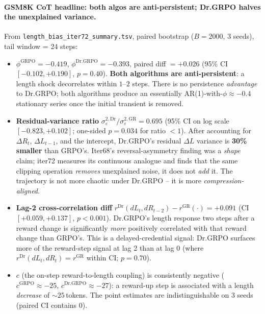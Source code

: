 \paragraph{GSM8K CoT headline: both algos are anti-persistent; Dr.GRPO halves the unexplained variance.}
From \texttt{length\_bias\_iter72\_summary.tsv}, paired bootstrap
($B = 2000$, 3 seeds), tail window = 24 steps:
\begin{itemize}
\item $\phi^{\mathrm{GRPO}} = -0.419$, $\phi^{\mathrm{Dr.GRPO}} = -0.393$,
      paired diff $= +0.026$ (95\% CI $[-0.102, +0.190]$, $p = 0.40$).
      \textbf{Both algorithms are anti-persistent}: a length shock
      decorrelates within $1$--$2$ steps. There is no persistence
      \emph{advantage} to Dr.GRPO; both algorithms produce an
      essentially AR(1)-with-$\phi \approx -0.4$ stationary series once
      the initial transient is removed.
\item \textbf{Residual-variance ratio} $\sigma^{2,\mathrm{Dr}}_\varepsilon /
      \sigma^{2,\mathrm{GR}}_\varepsilon = 0.695$ (95\% CI on log scale
      $[-0.823, +0.102]$; one-sided $p = 0.034$ for ratio $< 1$).
      After accounting for $\Delta R_t$, $\Delta L_{t-1}$, and the
      intercept, Dr.GRPO's residual $\Delta L$ variance is
      \textbf{30\% smaller} than GRPO's. Iter68's reversal-asymmetry
      finding was a \emph{shape} claim; iter72 measures its
      continuous analogue and finds that the same clipping operation
      \emph{removes} unexplained noise, it does not \emph{add} it. The
      trajectory is not more chaotic under Dr.GRPO -- it is more
      \emph{compression-aligned}.
\item \textbf{Lag-2 cross-correlation diff} $r^{\mathrm{Dr}}(dL_t,
      dR_{t-2}) - r^{\mathrm{GR}}(\cdot) = +0.091$ (CI $[+0.059,
      +0.137]$, $p < 0.001$). Dr.GRPO's length response two steps after
      a reward change is significantly \emph{more} positively correlated
      with that reward change than GRPO's. This is a delayed-credential
      signal: Dr.GRPO surfaces more of the reward-step signal at lag 2
      than at lag 0 (where $r^{\mathrm{Dr}}(dL_t, dR_t) = r^{\mathrm{GR}}$
      within CI; $p = 0.70$).
\item $c$ (the on-step reward-to-length coupling) is consistently
      negative ($c^{\mathrm{GRPO}} \approx -25$, $c^{\mathrm{Dr.GRPO}}
      \approx -27$): a reward-up step is associated with a length
      \emph{decrease} of $\sim 25$\,tokens. The point estimates are
      indistinguishable on 3 seeds (paired CI contains 0).
\end{itemize}


